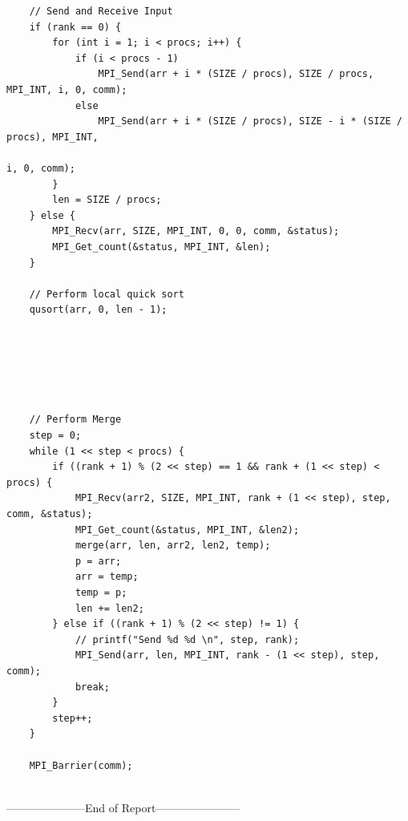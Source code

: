 \documentclass[11pt,a4paper,oneside]{article}
\begin{document}
    \begin{Verbatim}
    // Send and Receive Input
    if (rank == 0) {
    	for (int i = 1; i < procs; i++) {
    		if (i < procs - 1)
    			MPI_Send(arr + i * (SIZE / procs), SIZE / procs, MPI_INT, i, 0, comm);
    		else
    			MPI_Send(arr + i * (SIZE / procs), SIZE - i * (SIZE / procs), MPI_INT,
    																	  i, 0, comm);
    	}
    	len = SIZE / procs;
    } else {
    	MPI_Recv(arr, SIZE, MPI_INT, 0, 0, comm, &status);
    	MPI_Get_count(&status, MPI_INT, &len);
    }
    
    // Perform local quick sort
    qusort(arr, 0, len - 1);
    
    
    
    
    
    
    // Perform Merge
    step = 0;
    while (1 << step < procs) {
    	if ((rank + 1) % (2 << step) == 1 && rank + (1 << step) < procs) {
    		MPI_Recv(arr2, SIZE, MPI_INT, rank + (1 << step), step, comm, &status);
    		MPI_Get_count(&status, MPI_INT, &len2);
			merge(arr, len, arr2, len2, temp);
    		p = arr;
    		arr = temp;
    		temp = p;
    		len += len2;
    	} else if ((rank + 1) % (2 << step) != 1) {
    		// printf("Send %d %d \n", step, rank);
    		MPI_Send(arr, len, MPI_INT, rank - (1 << step), step, comm);
    		break;
    	}
    	step++;
    }
    
    MPI_Barrier(comm);
    
    \end{Verbatim}
    
    \begin{center}
    	---------------------End of Report-----------------------
    \end{center}
    
\end{document}
